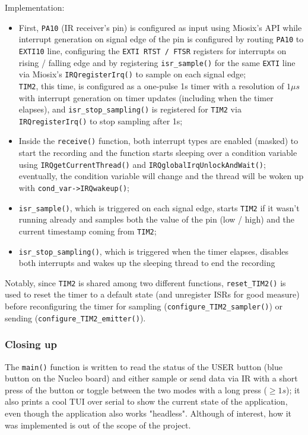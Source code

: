 \documentclass[10pt,a4]{article}
\begin{document}
Implementation:
\begin{itemize}
\item First, \texttt{PA10} (IR receiver's pin) is configured as input using Miosix's API while interrupt generation on signal edge of the pin is configured by routing \texttt{PA10} to \texttt{EXTI10} line,  configuring the \texttt{EXTI RTST / FTSR} registers for interrupts on rising / falling edge and by registering \texttt{isr\_sample()} for the same \texttt{EXTI} line via Miosix's \texttt{IRQregisterIrq()} to sample on each signal edge;\\
\texttt{TIM2}, this time, is configured as a one-pulse 1s timer with a resolution of $1\mu s$ with interrupt generation on timer updates (including when the timer elapses), and \texttt{isr\_stop\_sampling()} is registered for \texttt{TIM2} via \texttt{IRQregisterIrq()} to stop sampling after 1s;
\item Inside the \texttt{receive()} function, both interrupt types are enabled (masked) to start the recording and the function starts sleeping over a condition variable using \texttt{IRQgetCurrentThread()} and \texttt{IRQglobalIrqUnlockAndWait()}; eventually, the condition variable will change and the thread will be woken up with \texttt{cond\_var->IRQwakeup()};
\item \texttt{isr\_sample()}, which is triggered on each signal edge, starts \texttt{TIM2} if it wasn't running already and samples both the value of the pin (low / high) and the current timestamp coming from \texttt{TIM2};
\item \texttt{isr\_stop\_sampling()}, which is triggered when the timer elapses, disables both interrupts and wakes up the sleeping thread to end the recording
\end{itemize}

Notably, since \texttt{TIM2} is shared among two different functions, \texttt{reset\_TIM2()} is used to reset the timer to a default state (and unregister ISRs for good measure) before reconfiguring the timer for sampling (\texttt{configure\_TIM2\_sampler()}) or sending (\texttt{configure\_TIM2\_emitter()}).

\subsubsection{Closing up}
The \texttt{main()} function is written to read the status of the USER button (blue button on the Nucleo board) and either sample or send data via IR with a short press of the button or toggle between the two modes with a long press ($\geq 1s$); it also prints a cool TUI over serial to show the current state of the application, even though the application also works "headless". Although of interest, how it was implemented is out of the scope of the project.
\end{document}
